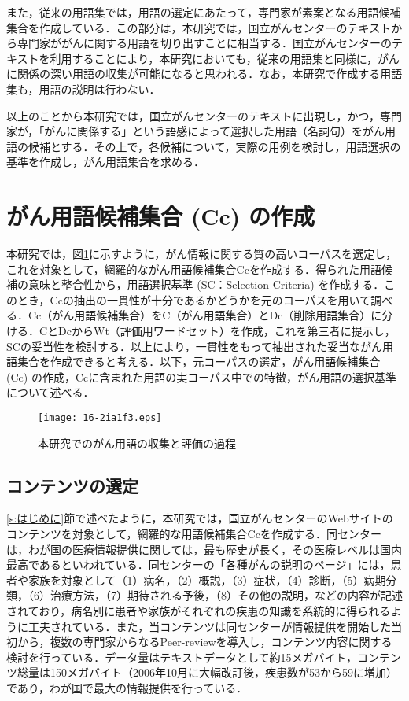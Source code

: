 \documentclass[japanese]{jnlp_1.4}
\begin{document}
また，従来の用語集では，用語の選定にあたって，専門家が素案となる用語候補集合を作成している．この部分は，本研究では，国立がんセンターのテキストから専門家ががんに関する用語を切り出すことに相当する．国立がんセンターのテキストを利用することにより，本研究においても，従来の用語集と同様に，がんに関係の深い用語の収集が可能になると思われる．なお，本研究で作成する用語集も，用語の説明は行わない．

以上のことから本研究では，国立がんセンターのテキストに出現し，かつ，専門家が，「がんに関係する」という語感によって選択した用語（名詞句）をがん用語の候補とする．その上で，各候補について，実際の用例を検討し，用語選択の基準を作成し，がん用語集合を求める．




\section{がん用語候補集合 (Cc) の作成}
\label{s:がん用語候補集合 (Cc) の作成}

本研究では，図\ref{f:003}に示すように，がん情報に関する質の高いコーパスを選定し，これを対象として，網羅的ながん用語候補集合Ccを作成する．得られた用語候補の意味と整合性から，用語選択基準 (SC：Selection Criteria) を作成する．このとき，Ccの抽出の一貫性が十分であるかどうかを元のコーパスを用いて調べる．Cc（がん用語候補集合）をC（がん用語集合）とDc（削除用語集合）に分ける．CとDcからWt（評価用ワードセット）を作成，これを第三者に提示し，SCの妥当性を検討する．以上により，一貫性をもって抽出された妥当ながん用語集合を作成できると考える．以下，元コーパスの選定，がん用語候補集合 (Cc) の作成，Ccに含まれた用語の実コーパス中での特徴，がん用語の選択基準について述べる．

\begin{figure}[t]
 \begin{center}
  \texttt{[image: 16-2ia1f3.eps]}
 \end{center}
 \caption{本研究でのがん用語の収集と評価の過程}
 \label{f:003}
\end{figure}


\subsection{コンテンツの選定}
\label{s:コンテンツの選定}

\ref{s:はじめに}節で述べたように，本研究では，国立がんセンターのWebサイトのコンテンツを対象として，網羅的な用語候補集合Ccを作成する．同センターは，わが国の医療情報提供に関しては，最も歴史が長く\cite{c13}，その医療レベルは国内最高であるといわれている．同センターの「各種がんの説明のページ」には，患者や家族を対象として（1）病名，（2）概説，（3）症状，（4）診断，（5）病期分類，（6）治療方法，（7）期待される予後，（8）その他の説明，などの内容が記述されており，病名別に患者や家族がそれぞれの疾患の知識を系統的に得られるように工夫されている．また，当コンテンツは同センターが情報提供を開始した当初から，複数の専門家からなるPeer-reviewを導入し，コンテンツ内容に関する検討を行っている．データ量はテキストデータとして約15メガバイト，コンテンツ総量は150メガバイト（2006年10月に大幅改訂後，疾患数が53から59に増加）であり，わが国で最大の情報提供を行っている．
\end{document}
